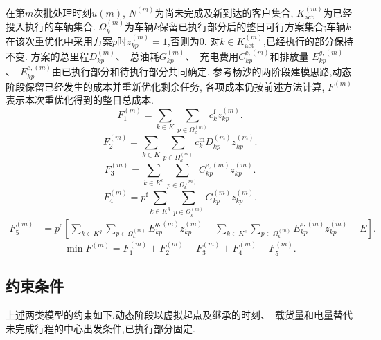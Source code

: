 \documentclass{setp-new}
\begin{document}
在第$m$次批处理时刻$u(m)$, $N^{(m)}$为尚未完成及新到达的客户集合,
$K_{\mathrm{act}}^{(m)}$为已经投入执行的车辆集合.
$\Omega_k^{(m)}$为车辆$k$保留已执行部分后的整日可行方案集合;车辆$k$在该次重优化中采用方案$p$时$z_{kp}^{(m)}=1$,否则为0.
对$k\in K_{\mathrm{act}}^{(m)}$,已经执行的部分保持不变.
方案的总里程$D_{kp}^{(m)}$、~总油耗$G_{kp}^{(m)}$、~充电费用$C_{kp}^{\mathrm e,(m)}$和排放量
$E_{kp}^{g,(m)}$、~$E_{kp}^{e,(m)}$由已执行部分和待执行部分共同确定.
参考杨沙的两阶段建模思路\cite{ref:yang2022},动态阶段保留已经发生的成本并重新优化剩余任务,
各项成本仍按前述方法计算, $F^{(m)}$表示本次重优化得到的整日总成本.
\begin{equation}
F_1^{(m)}
=\sum_{k\in K}\sum_{p\in\Omega_k^{(m)}}c_k^{\mathrm f}z_{kp}^{(m)}.
\label{eq:unified-dynamic-f1}
\end{equation}
\begin{equation}
F_2^{(m)}
=\sum_{k\in K}\sum_{p\in\Omega_k^{(m)}}c_k^{\mathrm m}D_{kp}^{(m)}z_{kp}^{(m)}.
\label{eq:unified-dynamic-f2}
\end{equation}
\begin{equation}
F_3^{(m)}
=\sum_{k\in K^{e}}\sum_{p\in\Omega_k^{(m)}}C_{kp}^{\mathrm e,(m)}z_{kp}^{(m)}.
\label{eq:unified-dynamic-f3}
\end{equation}
\begin{equation}
F_4^{(m)}
=p^{\mathrm f}\sum_{k\in K^{g}}\sum_{p\in\Omega_k^{(m)}}G_{kp}^{(m)}z_{kp}^{(m)}.
\label{eq:unified-dynamic-f4}
\end{equation}
\begin{equation}
\begin{aligned}
F_5^{(m)}
&=p^{\mathrm c}\left[
\sum_{k\in K^{g}}\sum_{p\in\Omega_k^{(m)}}E_{kp}^{g,(m)}z_{kp}^{(m)}
+\sum_{k\in K^{e}}\sum_{p\in\Omega_k^{(m)}}E_{kp}^{e,(m)}z_{kp}^{(m)}
-\overline E
\right].
\end{aligned}
\label{eq:unified-dynamic-f5}
\end{equation}
\begin{equation}
\min F^{(m)}
=F_1^{(m)}+F_2^{(m)}+F_3^{(m)}+F_4^{(m)}+F_5^{(m)}.
\label{eq:unified-dynamic-objective}
\end{equation}

\subsection{约束条件}

\begingroup
\setlength{\abovedisplayskip}{3pt}
\setlength{\belowdisplayskip}{3pt}
\setlength{\abovedisplayshortskip}{2pt}
\setlength{\belowdisplayshortskip}{2pt}
上述两类模型的约束如下.动态阶段以虚拟起点及继承的时刻、~载货量和电量替代未完成行程的中心出发条件,已执行部分固定.
\end{document}
